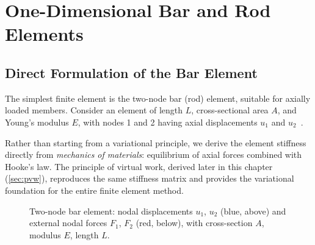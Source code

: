 \chapter{One-Dimensional Bar and Rod Elements}
\label{ch:1d}

\section{Direct Formulation of the Bar Element}
\label{sec:direct_formulation}

The simplest finite element is the two-node bar (rod) element, suitable for
axially loaded members. Consider an element of length $L$, cross-sectional
area $A$, and Young's modulus $E$, with nodes 1 and 2 having axial
displacements $u_1$ and $u_2$~\cite{logan2011first,cook2002concepts}.

Rather than starting from a variational principle, we derive the element
stiffness directly from \emph{mechanics of materials}: equilibrium of axial
forces combined with Hooke's law. The principle of virtual work, derived
later in this chapter (\cref{sec:pvw}), reproduces the same stiffness matrix
and provides the variational foundation for the entire finite element method.

\begin{figure}[htbp]
\centering
{}
\caption{Two-node bar element: nodal displacements $u_1$, $u_2$ (blue, above) and external nodal forces $F_1$, $F_2$ (red, below), with cross-section $A$, modulus $E$, length $L$.}
\label{fig:bar_element}
\end{figure}

